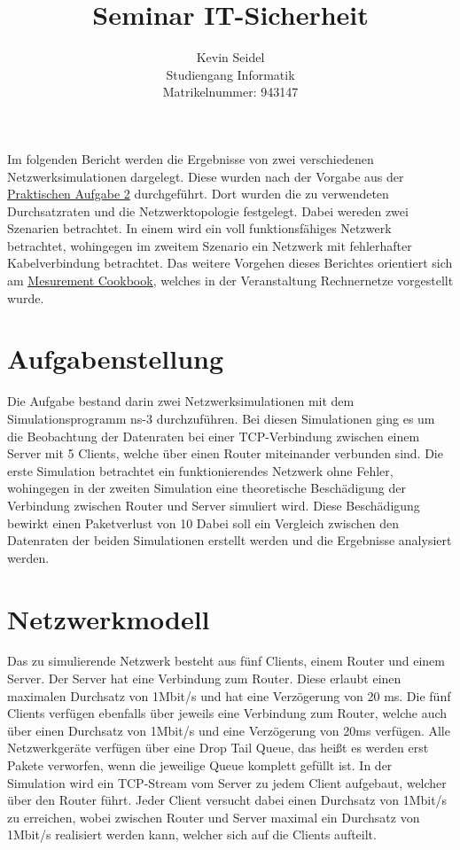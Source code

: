 \documentclass[a4paper, 12pt]{scrartcl}
\title{Seminar IT-Sicherheit}
\author{Kevin Seidel \\ Studiengang Informatik \\ Matrikelnummer: 943147}
\begin{document}
\setcounter{page}{1}

Im folgenden Bericht werden die Ergebnisse von zwei verschiedenen Netzwerksimulationen dargelegt. Diese wurden nach der Vorgabe aus der {\color{blue}\uline{ \href{http://sys.cs.uos.de/lehre/rene/2013/aufgaben/PA_Blatt02.pdf}{Praktischen Aufgabe 2}}} durchgeführt. Dort wurden die zu verwendeten Durchsatzraten und die Netzwerktopologie festgelegt.
Dabei wereden zwei Szenarien betrachtet. In einem wird ein voll funktionsfähiges Netzwerk betrachtet, wohingegen im zweitem Szenario ein Netzwerk mit fehlerhafter Kabelverbindung betrachtet.
Das weitere Vorgehen dieses Berichtes orientiert sich am {\color{blue}\uline{ \href{http://sys.cs.uos.de/lehre/rene/2013/folien/Kap3-Messungen.pdf}{ Mesurement Cookbook}}}, welches in der Veranstaltung Rechnernetze vorgestellt wurde.

\section{Aufgabenstellung}
Die Aufgabe bestand darin zwei Netzwerksimulationen mit dem Simulationsprogramm ns-3 durchzuführen. Bei diesen Simulationen ging es um die Beobachtung der Datenraten bei einer TCP-Verbindung zwischen einem Server mit 5 Clients, welche über einen Router miteinander verbunden sind.
Die erste Simulation betrachtet ein funktionierendes Netzwerk ohne Fehler, wohingegen in der zweiten Simulation eine theoretische Beschädigung der Verbindung zwischen Router und Server simuliert wird. Diese Beschädigung bewirkt einen Paketverlust von 10%
Dabei soll ein Vergleich zwischen den Datenraten der beiden Simulationen erstellt werden und die Ergebnisse analysiert werden.

\section{Netzwerkmodell}
Das zu simulierende Netzwerk besteht aus fünf Clients, einem Router und einem Server. 
Der Server hat eine Verbindung zum Router. Diese erlaubt einen maximalen Durchsatz von 1Mbit/s und hat eine Verzögerung von 20 ms.
Die fünf Clients verfügen ebenfalls über jeweils eine Verbindung zum Router, welche auch über einen Durchsatz von 1Mbit/s und eine Verzögerung von 20ms verfügen.
Alle Netzwerkgeräte verfügen über eine Drop Tail Queue, das heißt es werden erst Pakete verworfen, wenn die jeweilige Queue komplett gefüllt ist.
In der Simulation wird ein TCP-Stream vom Server zu jedem Client aufgebaut, welcher über den Router führt. Jeder Client versucht dabei einen Durchsatz von 1Mbit/s zu erreichen, wobei zwischen Router und Server maximal ein Durchsatz von 1Mbit/s realisiert werden kann, welcher sich auf die Clients aufteilt.
\end{document}
